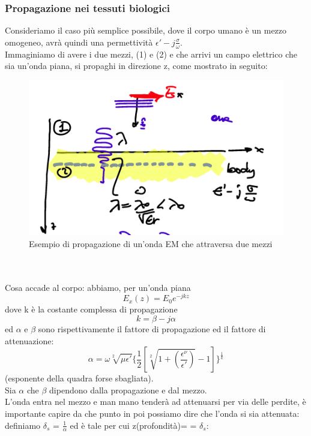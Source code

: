 \documentclass[oneside, 12pt]{extbook}
\begin{document}
\subsubsection{Propagazione nei tessuti biologici}
Consideriamo il caso più semplice possibile, dove il corpo umano è un mezzo omogeneo, avrà quindi una permettività $\epsilon' - j \frac{\sigma}{\omega}$.\\Immaginiamo di avere i due mezzi, (1) e (2) e che arrivi un campo elettrico che sia un'onda piana, si propaghi in direzione z, come mostrato in seguito:
\begin{figure}[!h]
	\includegraphics[scale=0.5]{immagini/es_propag.png}
	\caption{Esempio di propagazione di un'onda EM che attraversa due mezzi}
\end{figure}
\\\\Cosa accade al corpo: abbiamo, per un'onda piana
\begin{equation}
	E_x(z) = E_0 e^{-jkz}
\end{equation}
dove k è la costante complessa di propagazione
\begin{equation}
	k = \beta -j \alpha
\end{equation}
ed $\alpha$ e $\beta$ sono rispettivamente il fattore di propagazione ed il fattore di attenuazione:
\begin{equation}
	\alpha = \omega\sqrt[2]{\mu\epsilon'}\{ \frac{1}{2}[ \sqrt[2]{1 + (\frac{\epsilon^{\nu}}{\epsilon'})} -1] \}^{\frac{1}{k}}
\end{equation}
(esponente della quadra forse sbagliata).\\Sia $\alpha$ che $\beta$ dipendono dalla propagazione e dal mezzo.\\L'onda entra nel mezzo e man mano tenderà ad attenuarsi per via delle perdite, è importante capire da che punto in poi possiamo dire che l'onda si sia attenuata: definiamo $\delta_s$ = $\frac{1}{\alpha}$ ed è tale per cui z(profondità)= = $\delta_s$:
\end{document}
